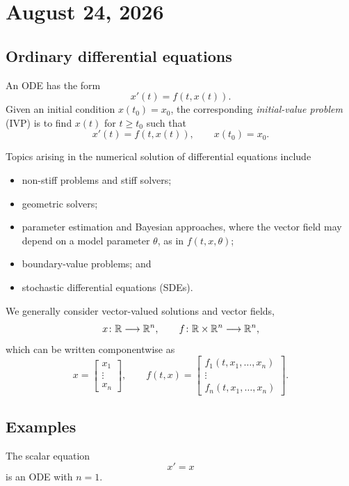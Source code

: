\section{August 24, 2026}

\subsection{Ordinary differential equations}

An ODE has the form
\[
  x'(t)=f(t,x(t)).
\]
Given an initial condition $x(t_0)=x_0$, the corresponding
\emph{initial-value problem} (IVP) is to find $x(t)$ for $t\geq t_0$ such
that
\begin{equation}\label{eq:ivp}
  x'(t)=f(t,x(t)),
  \qquad
  x(t_0)=x_0.
\end{equation}

Topics arising in the numerical solution of differential equations include
\begin{itemize}
  \item non-stiff problems and stiff solvers;
  \item geometric solvers;
  \item parameter estimation and Bayesian approaches, where the vector
    field may depend on a model parameter $\theta$, as in $f(t,x,\theta)$;
  \item boundary-value problems; and
  \item stochastic differential equations (SDEs).
\end{itemize}

We generally consider vector-valued solutions and vector fields,
\[
  x\colon \mathbb{R}\longrightarrow \mathbb{R}^n,
  \qquad
  f\colon \mathbb{R}\times\mathbb{R}^n\longrightarrow\mathbb{R}^n,
\]
which can be written componentwise as
\[
  x=
  \begin{bmatrix}
    x_1\\ \vdots\\ x_n
  \end{bmatrix},
  \qquad
  f(t,x)=
  \begin{bmatrix}
    f_1(t,x_1,\ldots,x_n)\\
    \vdots\\
    f_n(t,x_1,\ldots,x_n)
  \end{bmatrix}.
\]

\subsection{Examples}

\begin{example}
  The scalar equation
  \[
    x'=x
  \]
  is an ODE with $n=1$.
\end{example}

